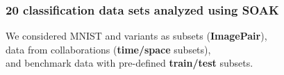 \documentclass[t,aspectratio=1610]{beamer}
\begin{document}
\begin{frame}
  \frametitle{20 classification data sets analyzed using SOAK} We
  considered MNIST and variants as subsets (\textbf{ImagePair}),\\
  data from collaborations (\textbf{time/space} subsets), \\
  and benchmark data with
  pre-defined \textbf{train/test} subsets.  \scriptsize



\end{frame}
\end{document}

